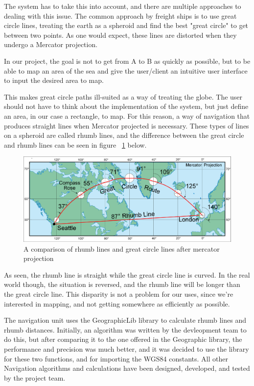 The system has to take this into account, and there are multiple approaches to dealing with this issue. The common approach by freight ships is to use great circle lines, treating the earth as a spheroid and find the best "great circle" to get between two points. As one would expect, these lines are distorted when they undergo a Mercator projection. 

In our project, the goal is not to get from A to B as quickly as possible, but to be able to map an area of the sea and give the user/client an intuitive user interface to input the desired area to map. 

This makes great circle paths ill-suited as a way of treating the globe. The user should not have to think about the implementation of the system, but just define an area, in our case a rectangle, to map. For this reason, a way of navigation that produces straight lines when Mercator projected is necessary. These types of lines on a spheroid are called rhumb lines, and the difference between the great circle and rhumb lines can be seen in figure ~\ref{fig:rhumbgreatcirclemercator} below.

\begin{figure}[H]
\centering
\includegraphics[width=0.9\linewidth]{Images/Implementation/Rhumb_vs_great_circle_mercator_projection}
\caption{A comparison of rhumb lines and great circle lines after mercator projection}
\label{fig:rhumbgreatcirclemercator}
\end{figure}

As seen, the rhumb line is straight while the great circle line is curved. In the real world though, the situation is reversed, and the rhumb line will be longer than the great circle line. This disparity is not a problem for our uses, since we're interested in mapping, and not getting somewhere as efficiently as possible. 

The navigation unit uses the GeographicLib library to calculate rhumb lines and rhumb distances. Initially, an algorithm was written by the devleopment team to do this, but after comparing it to the one offered in the Geographic library, the performance and precision was much better, and it was decided to use the library for these two functions, and for importing the WGS84 constants. All other Navigation algorithms and calculations have been designed, developed, and tested by the project team.

